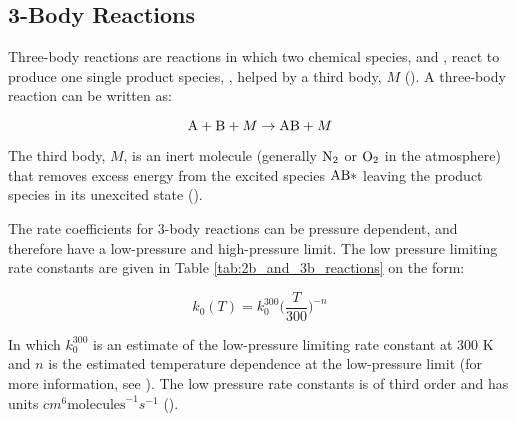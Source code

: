 \subsection{3-Body Reactions}\label{sec:3body_reactions}

Three-body reactions are reactions in which two chemical species,  and , react to produce one single product species, , helped by a third body, $M$ (\cite{Jacob1999}). A three-body reaction can be written as: 

\begin{equation*}
    \mathrm{A} + \mathrm{B} + M \rightarrow \mathrm{AB} + M
\end{equation*}


The third body, $M$, is an inert molecule (generally $\mathrm{N_2}$ or $\mathrm{O_2}$ in the atmosphere) that removes excess energy from the excited species $\mathrm{AB*}$ leaving the product species  in its unexcited state (\cite{Jacob1999}).


\medskip





The rate coefficients for 3-body reactions can be pressure dependent, and therefore have a low-pressure and high-pressure limit. The low pressure limiting rate constants are given in Table \ref{tab:2b_and_3b_reactions} on the form: 

\begin{equation}
    k_0(T) = k_0^{300}\Big(\frac{T}{300}\Big)^{-n}    
    \label{eq:3b_low_pressure}
\end{equation}

In which $k_0^{300}$ is an estimate of the low-pressure limiting rate constant at 300 K and $n$ is the estimated temperature dependence at the low-pressure limit (for more information, see \cite{JPL}). The low pressure rate constants is of third order and has units $cm^6\text{molecules}^{-1}s^{-1}$ (\cite{AtmModFund}).


